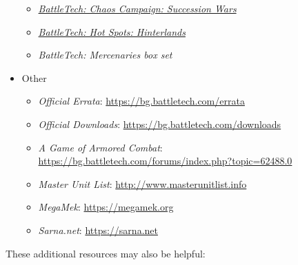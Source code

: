 \begin{itemize}
\begin{itemize}
    \item \emph{\href{https://store.catalystgamelabs.com/products/battletech-chaos-campaign-succession-wars}{BattleTech: Chaos Campaign: Succession Wars}}

    \item \emph{\href{https://store.catalystgamelabs.com/products/battletech-hot-spots-hinterlands}{BattleTech: Hot Spots: Hinterlands}}

    \item \emph{BattleTech: Mercenaries box set}

  \end{itemize}

  \item Other

  \begin{itemize}

    \item \emph{Official Errata}: \href{https://bg.battletech.com/errata}{https://bg.battletech.com/errata}

    \item \emph{Official Downloads}: \href{https://bg.battletech.com/downloads}{https://bg.battletech.com/downloads}

    \item \emph{A Game of Armored Combat}: \href{https://bg.battletech.com/forums/index.php?topic=62488.0}{https://bg.battletech.com/forums/index.php?topic=62488.0}

    \item \emph{Master Unit List}: \href{http://www.masterunitlist.info}{http://www.masterunitlist.info}

    \item \emph{MegaMek}: \href{https://megamek.org}{https://megamek.org}

    \item \emph{Sarna.net}: \href{https://sarna.net}{https://sarna.net}

  \end{itemize}

\end{itemize}

These additional resources may also be helpful:

